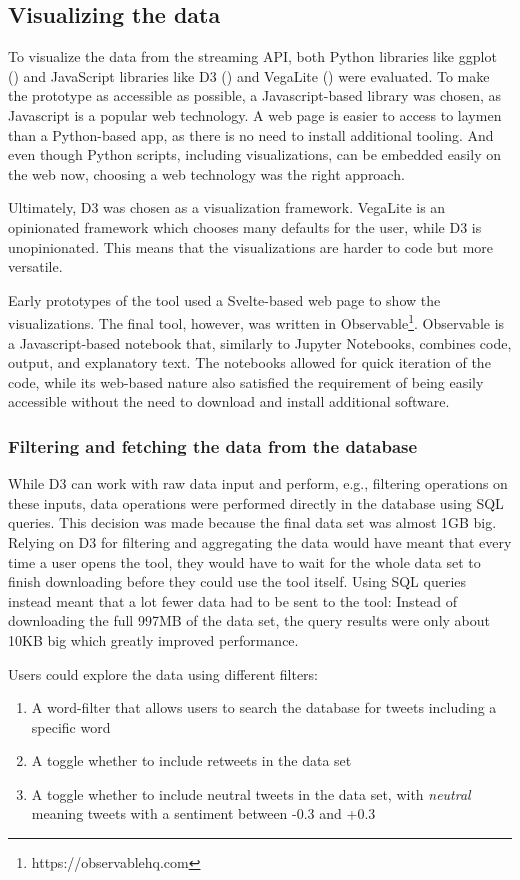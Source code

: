 \subsection{Visualizing the data}
To visualize the data from the streaming API, both Python libraries like ggplot (\cite{wickham2016}) and JavaScript libraries like D3 (\cite{bostock}) and VegaLite (\cite{uwidl}) were evaluated. To make the prototype as accessible as possible, a Javascript-based library was chosen, as Javascript is a popular web technology. A web page is easier to access to laymen than a Python-based app, as there is no need to install additional tooling. And even though Python scripts, including visualizations, can be embedded easily on the web now, choosing a web technology was the right approach.

Ultimately, D3 was chosen as a visualization framework. VegaLite is an opinionated framework which chooses many defaults for the user, while D3 is unopinionated. This means that the visualizations are harder to code but more versatile.

Early prototypes of the tool used a Svelte-based web page to show the visualizations. The final tool, however, was written in Observable\footnote{https://observablehq.com}. Observable is a Javascript-based notebook that, similarly to Jupyter Notebooks, combines code, output, and explanatory text. The notebooks allowed for quick iteration of the code, while its web-based nature also satisfied the requirement of being easily accessible without the need to download and install additional software.

\subsubsection{Filtering and fetching the data from the database}
While D3 can work with raw data input and perform, e.g., filtering operations on these inputs, data operations were performed directly in the database using SQL queries. This decision was made because the final data set was almost 1GB big. Relying on D3 for filtering and aggregating the data would have meant that every time a user opens the tool, they would have to wait for the whole data set to finish downloading before they could use the tool itself. Using SQL queries instead meant that a lot fewer data had to be sent to the tool: Instead of downloading the full 997MB of the data set, the query results were only about 10KB big which greatly improved performance.

Users could explore the data using different filters:
\begin{enumerate}
    \item A word-filter that allows users to search the database for tweets including a specific word
    \item A toggle whether to include retweets in the data set
    \item A toggle whether to include neutral tweets in the data set, with \emph{neutral} meaning tweets with a sentiment between -0.3 and +0.3 %
\end{enumerate}

